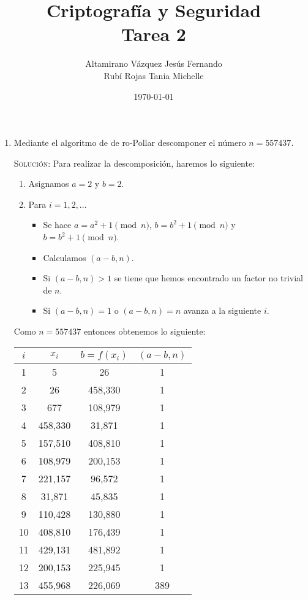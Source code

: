 \documentclass[letterpaper,11pt]{article}
\title{Criptografía y Seguridad \\ Tarea 2}
\author{Altamirano Vázquez Jesús Fernando \\
        Rubí Rojas Tania Michelle}
\date{\today}
\begin{document}
\maketitle

\begin{enumerate}
     \item Mediante el algoritmo de de ro-Pollar descomponer el número 
    $n = 557437$.
    
    \textsc{Solución:} Para realizar la descomposición, haremos lo siguiente:
    \begin{enumerate}
        \item Asignamos $a = 2$ y $b = 2$.
        \item Para $i = 1,2,...$ 
        \begin{itemize}
            \item Se hace $a = a^{2} + 1 \pmod{n}$, $b = b^{2} + 1 \pmod{n}$ y 
            $b = b^{2} + 1 \pmod{n}$. 
            \item Calculamos $(a - b, n)$.
            \item Si $(a - b, n) > 1$ se tiene que hemos encontrado un factor 
            no trivial de $n$.
            \item Si $(a - b, n) = 1$ o $(a - b, n) = n$ avanza a la siguiente 
            $i$.
        \end{itemize}
    \end{enumerate}
    
    Como $n = 557437$ entonces obtenemos lo siguiente:
    \begin{center}
        \begin{tabular}{|c|c|c|c|} 
            \hline
            $i$ & $x_{i}$ & $b = f(x_{i})$ & $(a - b, n)$ \\ \hline
            1 & 5 & 26 & 1 \\ \hline
            2 & 26 & 458,330 & 1 \\ \hline
            3 & 677 & 108,979 & 1 \\ \hline
            4 & 458,330 & 31,871 & 1 \\ \hline
            5 & 157,510 & 408,810 & 1 \\ \hline
            6 & 108,979 & 200,153 & 1 \\ \hline
            7 & 221,157 & 96,572 & 1 \\ \hline
            8 & 31,871 & 45,835 & 1 \\ \hline
            9 & 110,428 & 130,880 & 1 \\ \hline
            10 & 408,810 & 176,439 & 1 \\ \hline
            11 & 429,131 & 481,892 & 1 \\ \hline
            12 & 200,153 & 225,945 & 1 \\ \hline
            13 & 455,968 & 226,069 & 389 \\ \hline
        \end{tabular}
    \end{center}
    

\end{enumerate}
\end{document}
